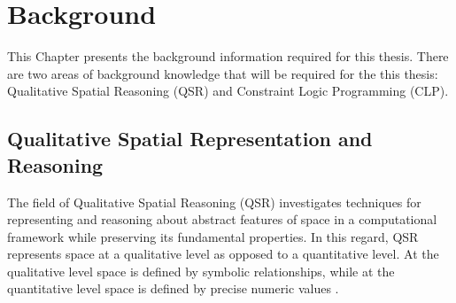 \documentclass[12pt]{ucthesis}
\begin{document}







\chapter{Background} \label{background}
This Chapter presents the background information required for this thesis. There are two areas of background knowledge that will be required for the this thesis: Qualitative Spatial Reasoning (QSR) and Constraint Logic Programming (CLP).

\section{Qualitative Spatial Representation and Reasoning}
The field of Qualitative Spatial Reasoning (QSR) investigates techniques for representing and reasoning about abstract features of space in a computational framework while preserving its fundamental properties. In this regard, QSR represents space at a qualitative level as opposed to a quantitative level. At the qualitative level space is defined by symbolic relationships, while at the quantitative level space is defined by precise numeric values \cite{freksa1991qsr} \cite{bhatt-spatial-computing}. 
\end{document}
